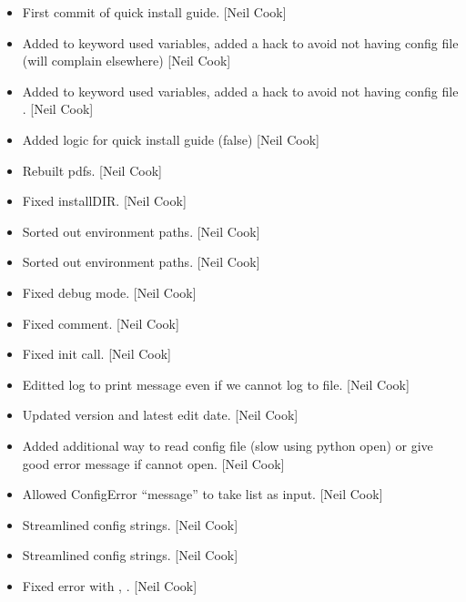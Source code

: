 \documentclass[a4paper,10pt,english]{report}
\begin{document}
\begin{itemize}
\item {} 
First commit of quick install guide. {[}Neil Cook{]}

\item {} 
Added  to keyword used variables, added a hack to avoid
not having config file  (will complain elsewhere) {[}Neil Cook{]}

\item {} 
Added  to keyword used variables, added a hack to avoid
not having config file . {[}Neil Cook{]}

\item {} 
Added logic for quick install guide (false) {[}Neil Cook{]}

\item {} 
Rebuilt pdfs. {[}Neil Cook{]}

\item {} 
Fixed installDIR. {[}Neil Cook{]}

\item {} 
Sorted out environment paths. {[}Neil Cook{]}

\item {} 
Sorted out environment paths. {[}Neil Cook{]}

\item {} 
Fixed debug mode. {[}Neil Cook{]}

\item {} 
Fixed comment. {[}Neil Cook{]}

\item {} 
Fixed init  call. {[}Neil Cook{]}

\item {} 
Editted log to print message even if we cannot log to file. {[}Neil
Cook{]}

\item {} 
Updated version and latest edit date. {[}Neil Cook{]}

\item {} 
Added additional way to read config file (slow using python open) or
give good error message if cannot open. {[}Neil Cook{]}

\item {} 
Allowed ConfigError “message” to take list as input. {[}Neil Cook{]}

\item {} 
Streamlined config strings. {[}Neil Cook{]}

\item {} 
Streamlined config strings. {[}Neil Cook{]}

\item {} 
Fixed error with , . {[}Neil Cook{]}

\end{itemize}
\end{document}
